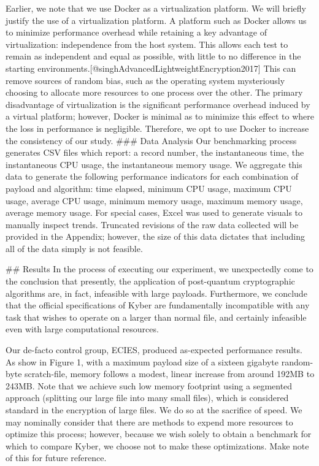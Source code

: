 \documentclass[12pt]{article}
\begin{document}
Earlier, we note that we use Docker as a virtualization platform. We will briefly justify the use of a virtualization platform. A platform such as Docker allows us to minimize performance overhead while retaining a key advantage of virtualization: independence from the host system. This allows each test to remain as independent and equal as possible, with little to no difference in the starting environments.[@singhAdvancedLightweightEncryption2017] This can remove sources of random bias, such as the operating system mysteriously choosing to allocate more resources to one process over the other. The primary disadvantage of virtualization is the significant performance overhead induced by a virtual platform; however, Docker is minimal as to minimize this effect to where the loss in performance is negligible. Therefore, we opt to use Docker to increase the consistency of our study. 
### Data Analysis
Our benchmarking process generates CSV files which report: a record number, the instantaneous time, the instantaneous CPU usage, the instantaneous memory usage. We aggregate this data to generate the following performance indicators for each combination of payload and algorithm: time elapsed, minimum CPU usage, maximum CPU usage, average CPU usage, minimum memory usage, maximum memory usage, average memory usage. For special cases, Excel was used to generate visuals to manually inspect trends. Truncated revisions of the raw data collected will be provided in the Appendix; however, the size of this data dictates that including all of the data simply is not feasible. 

## Results
In the process of executing our experiment, we unexpectedly come to the conclusion that presently, the application of post-quantum cryptographic algorithms are, in fact, infeasible with large payloads. Furthermore, we conclude that the official specifications of Kyber are fundamentally incompatible with any task that wishes to operate on a larger than normal file, and certainly infeasible even with large computational resources. 

Our de-facto control group, ECIES, produced as-expected performance results. As show in Figure 1, with a maximum payload size of a sixteen gigabyte random-byte scratch-file, memory follows a modest, linear increase from around 192MB to 243MB. Note that we achieve such low memory footprint using a segmented approach (splitting our large file into many small files), which is considered standard in the encryption of large files. We do so at the sacrifice of speed. We may nominally consider that there are methods to expend more resources to optimize this process; however, because we wish solely to obtain a benchmark for which to compare Kyber, we choose not to make these optimizations. Make note of this for future reference. 
\end{document}
